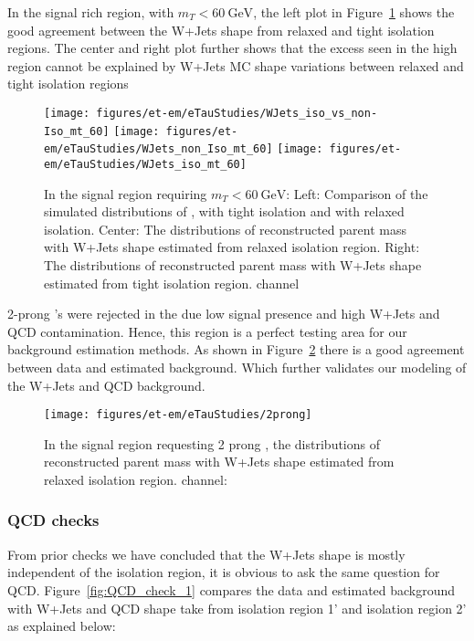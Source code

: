 In the signal rich region, with $m_T < 60~\text{GeV}$, the left plot
in Figure~\ref{fig:mT_60} shows the good agreement between the W+Jets 
shape from relaxed and tight \tauh isolation regions. The center and right
plot further shows that the excess seen in the high \meffetau region cannot be
explained by W+Jets MC shape variations between relaxed and tight \tauh
isolation regions

\begin{figure}\centering
  \texttt{[image: figures/et-em/eTauStudies/WJets\_iso\_vs\_non-Iso\_mt\_60]}
  \texttt{[image: figures/et-em/eTauStudies/WJets\_non\_Iso\_mt\_60]}
  \texttt{[image: figures/et-em/eTauStudies/WJets\_iso\_mt\_60]}
  \caption{\label{fig:mT_60} In the signal region requiring 
    $m_T < 60~\text{GeV}$: Left: Comparison of the simulated
    distributions of \meffetau, with tight \tauh isolation and 
    with relaxed \tauh isolation. Center: The distributions of
    reconstructed parent mass with W+Jets shape estimated from
    relaxed \tauh isolation region. Right: The distributions of
    reconstructed parent mass with W+Jets shape estimated from
    tight \tauh isolation region. \teth channel}
\end{figure}

2-prong \tauh's were rejected in the \teth due low signal presence and
high W+Jets and QCD contamination. Hence, this region is a perfect testing area
for our background estimation methods. As shown in Figure~\ref{fig:2prong}
there is a good agreement between data and estimated background. Which further
validates our modeling of the W+Jets and QCD background. 

\begin{figure}\centering
  \texttt{[image: figures/et-em/eTauStudies/2prong]}
  \caption{\label{fig:2prong} In the signal region requesting
    2 prong \tauh, the distributions of reconstructed parent mass with
    W+Jets shape estimated from relaxed \tauh isolation region.
    \teth channel: \meffetau}
\end{figure}

\subsubsection{QCD checks}
From prior checks we have concluded that the W+Jets \meffetau shape is mostly
independent of the \tauh isolation region, it is obvious to ask the same
question for QCD. Figure~\ref{fig:QCD_check_1} compares the data and estimated
background with W+Jets and QCD shape take from \tauh isolation region 1' and 
\tauh isolation region 2' as explained below:

